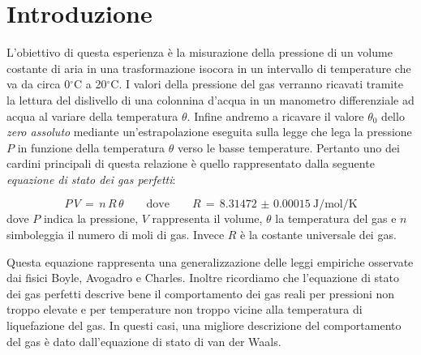 \section{Introduzione}
L'obiettivo di questa esperienza è la misurazione della pressione di un volume costante di aria in una trasformazione isocora in un intervallo di temperature che va da circa 0$^\circ$C a 20$^\circ$C. I valori della pressione del gas verranno ricavati tramite la lettura del dislivello di una colonnina d'acqua in un manometro differenziale ad acqua al variare della temperatura $\theta$.
Infine andremo a ricavare il valore $\theta_0$ dello \emph{zero assoluto} mediante un'estrapolazione eseguita sulla legge che lega la pressione $P$ in funzione della temperatura $\theta$ verso le basse temperature.
Pertanto uno dei cardini principali di questa relazione è quello rappresentato dalla seguente \emph{equazione di stato dei gas perfetti}:

\begin{equation}
    P \, V \,=\, n \, R \, \theta \quad\quad \text{dove} \quad\quad R \,=\, \SI{8.31472(15)}{\joule\per\mole\per\kelvin}
	\label{eq:legge_stato_gas}
\end{equation}
%
dove $P$ indica la pressione, $V$ rappresenta il volume, $\theta$ la temperatura del gas e $n$ simboleggia il numero di moli di gas. Invece $R$ è la costante universale dei gas.

\bigskip
Questa equazione rappresenta una generalizzazione delle leggi empiriche osservate dai fisici Boyle, Avogadro e Charles. Inoltre ricordiamo che l'equazione di stato dei gas perfetti descrive bene il comportamento dei gas reali per pressioni non troppo elevate e per temperature non troppo vicine alla temperatura di liquefazione del gas. In questi casi, una migliore descrizione del comportamento del gas è dato dall'equazione di stato di van der Waals.
